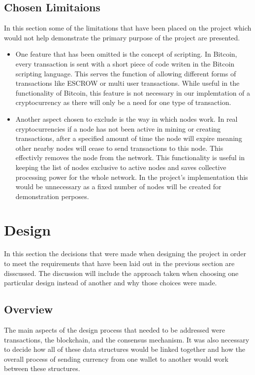 \documentclass{l4proj}
\begin{document}
\section{Chosen Limitaions}
In this section some of the limitations that have been placed on the project which would not help demonstrate the 
primary purpose of the project are presented.
\begin{itemize}
    \item One feature that has been omitted is the concept of scripting. In Bitcoin, every transaction is sent
        with a short piece of code writen in the Bitcoin scripting language. This serves the function of allowing 
        different forms of transactions like ESCROW or multi user transactions. While useful in the functionality of
        Bitcoin, this feature is not necessary in our implemtation of a cryptocurrency as there will only be a need
        for one type of transaction.
    \item Another aspect chosen to exclude is the way in which nodes work. In real cryptocurrencies if a node
        has not been active in mining or creating transactions, after a specified amount of time the node will expire
        meaning other nearby nodes will cease to send transactions to this node. This effectivly removes the node from
        the network. This functionality is useful in keeping the list of nodes exclusive to active nodes and saves
        collective processing power for the whole network. In the project's implementation this would be unnecessary as a fixed
        number of nodes will be created for demonstration perposes.
\end{itemize}

\chapter{Design}
In this section the decisions that were made when designing the project in order to meet the requirements
that have been laid out in the previous section are disscussed. The discussion will include the approach taken when
choosing one particular design instead of another and why those choices were made.

\section{Overview}
The main aspects of the design process that needed to be addressed were transactions, the blockchain, and
the consensus mechanism. It was also necessary to decide how all of these data structures would be linked together and
how the overall process of sending currency from one wallet to another would work between these structures.
\end{document}
